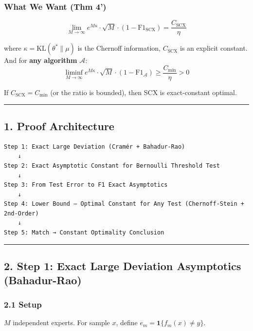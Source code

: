 \documentclass[
  12pt,
]{article}
\begin{document}
\subsubsection{What We Want (Thm 4')}\label{what-we-want-thm-4}

\[\lim_{M\to\infty} e^{M\kappa} \cdot \sqrt{M} \cdot (1 - \text{F1}_{\text{SCX}}) = \frac{C_{\text{SCX}}}{\eta}\]

where \(\kappa = \text{KL}(\theta^* \| \mu)\) is the Chernoff information, \(C_{\text{SCX}}\) is an explicit constant. And for \textbf{any algorithm} \(\mathcal{A}\):
\[\liminf_{M\to\infty} e^{M\kappa} \cdot \sqrt{M} \cdot (1 - \text{F1}_{\mathcal{A}}) \geq \frac{C_{\text{min}}}{\eta} > 0\]

If \(C_{\text{SCX}} = C_{\text{min}}\) (or the ratio is bounded), then SCX is exact-constant optimal.

\begin{center}\rule{0.5\linewidth}{0.5pt}\end{center}

\subsection{1. Proof Architecture}\label{proof-architecture}

\begin{verbatim}
Step 1: Exact Large Deviation (Cramér + Bahadur-Rao)
    ↓
Step 2: Exact Asymptotic Constant for Bernoulli Threshold Test
    ↓
Step 3: From Test Error to F1 Exact Asymptotics
    ↓
Step 4: Lower Bound — Optimal Constant for Any Test (Chernoff-Stein + 2nd-Order)
    ↓
Step 5: Match → Constant Optimality Conclusion
\end{verbatim}

\begin{center}\rule{0.5\linewidth}{0.5pt}\end{center}

\subsection{2. Step 1: Exact Large Deviation Asymptotics (Bahadur-Rao)}\label{step-1-exact-large-deviation-asymptotics-bahadur-rao}

\subsubsection{2.1 Setup}\label{setup}

\(M\) independent experts. For sample \(x\), define \(e_m = \mathbf{1}\{f_m(x) \neq y\}\).
\end{document}
